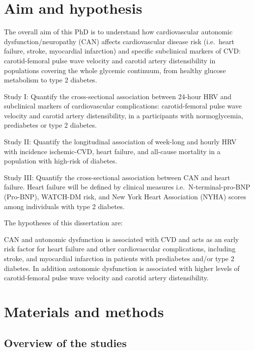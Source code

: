 \documentclass[
  a4paper,
  headsepline=true,
  open=any]{scrbook}
\begin{document}

\hypertarget{aim-and-hypothesis}{%
\chapter{Aim and hypothesis}\label{aim-and-hypothesis}}

The overall aim of this PhD is to understand how cardiovascular
autonomic dysfunction/neuropathy (CAN) affects cardiovascular disease
risk (i.e.~heart failure, stroke, myocardial infarction) and specific
subclinical markers of CVD: carotid-femoral pulse wave velocity and
carotid artery distensibility in populations covering the whole glycemic
continuum, from healthy glucose metabolism to type 2 diabetes.

Study I: Quantify the cross-sectional association between 24-hour HRV
and subclinical markers of cardiovascular complications: carotid-femoral
pulse wave velocity and carotid artery distensibility, in a participants
with normoglycemia, prediabetes or type 2 diabetes.

Study II: Quantify the longitudinal association of week-long and hourly
HRV with incidence ischemic-CVD, heart failure, and all-cause mortality
in a population with high-risk of diabetes.

Study III: Quantify the cross-sectional association between CAN and
heart failure. Heart failure will be defined by clinical measures
i.e.~N-terminal-pro-BNP (Pro-BNP), WATCH-DM risk, and New York Heart
Association (NYHA) scores among individuals with type 2 diabetes.

The hypotheses of this dissertation are:

CAN and autonomic dysfunction is associated with CVD and acts as an
early risk factor for heart failure and other cardiovascular
complications, including stroke, and myocardial infarction in patients
with prediabetes and/or type 2 diabetes. In addition autonomic
dysfunction is associated with higher levels of carotid-femoral pulse
wave velocity and carotid artery distensibility.


\hypertarget{materials-and-methods}{%
\chapter{Materials and methods}\label{materials-and-methods}}

\hypertarget{overview-of-the-studies}{%
\section{Overview of the studies}\label{overview-of-the-studies}}
\end{document}
